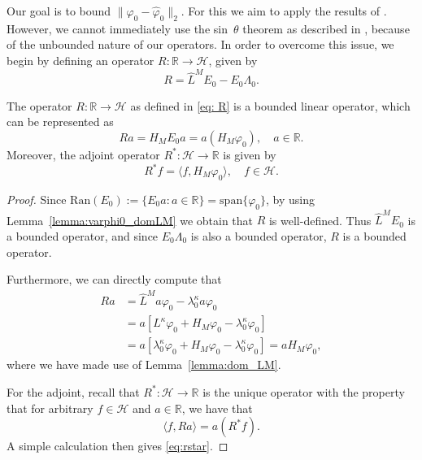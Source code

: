 \documentclass{aptpub}
\newcommand{\R}{\mathbb R}
\newcommand{\lspan}{\mathrm{span}}
\renewcommand{\H}{\mathcal H}
\begin{document}
Our goal is to bound $\|\varphi_0-\widehat\varphi_0\|_2$.
For this we aim to apply the results of \cite{DavisKahan1970}.
However, we cannot immediately use the sin~$\theta$ theorem as described in \cite{DavisKahan1970}, because of the unbounded nature of our operators.
In order to overcome this issue, we begin by defining an operator $R: \R \to \H$, given by 
\begin{equation}
\label{eq: R}
    R = \widehat L^M E_0 - E_0 \Lambda_0.
\end{equation}
\begin{lemma}
The operator $R \colon \R\to\H$ as defined in \eqref{eq: R} is a bounded linear operator, which can be represented as
    \begin{equation*}
        Ra = H_M E_0 a = a (H_M\varphi_0), \quad a\in\R.
    \end{equation*}
    Moreover, the adjoint operator $R^*: \H \to \R$ is given by
    \begin{equation}
        R^* f = \langle f, H_M\varphi_0\rangle, \quad f\in \H.
        \label{eq:rstar}
    \end{equation}
\end{lemma}
\begin{proof}
    Since $\mathrm{Ran}(E_0):= \{E_0 a:a\in \R\} =\lspan\{\varphi_0\}$, by using Lemma~\ref{lemma:varphi0_domLM} we obtain that $R$ is well-defined. Thus $\widehat L^M E_0$ is a bounded operator, and since $E_0 \Lambda_0$ is also a bounded operator, $R$ is a bounded operator.
    
    Furthermore, we can directly compute that
    \begin{equation*}
        \begin{split}
            Ra &= \widehat L^M a \varphi_0 - \lambda_0^\kappa a \varphi_0\\
            &= a [L^\kappa \varphi_0 + H_M\varphi_0- \lambda_0^\kappa  \varphi_0]\\
            &= a[ \lambda_0^\kappa  \varphi_0+H_M\varphi_0- \lambda_0^\kappa \varphi_0]
            = a H_M \varphi_0,
        \end{split} 
    \end{equation*}
    where we have made use of Lemma~\ref{lemma:dom_LM}.
    
    For the adjoint, recall that $R^*: \H \to \R$ is the unique operator with the property that for arbitrary $f\in\mathcal H$ and $a \in \R$, we have that
    \begin{equation*}
        \langle f, R a \rangle =  a (R^* f) .
    \end{equation*}
    A simple calculation then gives \eqref{eq:rstar}.
\end{proof}
\end{document}
